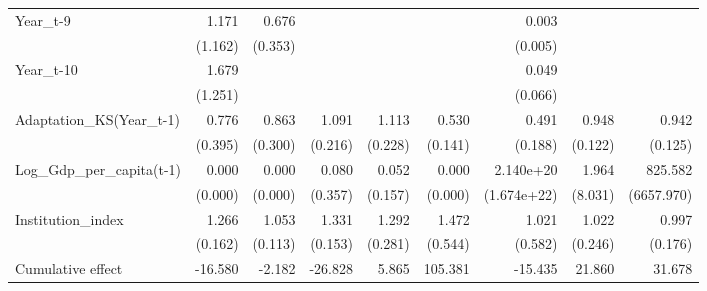 \begin{table}[htbp]
\begin{tabular}{l*{8}{D{.}{.}{-1}}}
Year\_t-9            &       1.171         &       0.676         &                     &                     &                     &       0.003\sym{***}&                     &                     \\
                    &     (1.162)         &     (0.353)         &                     &                     &                     &     (0.005)         &                     &                     \\
Year\_t-10           &       1.679         &                     &                     &                     &                     &       0.049\sym{**} &                     &                     \\
                    &     (1.251)         &                     &                     &                     &                     &     (0.066)         &                     &                     \\
Adaptation\_KS(Year\_t-1)&       0.776         &       0.863         &       1.091         &       1.113         &       0.530\sym{**} &       0.491\sym{*}  &       0.948         &       0.942         \\
                    &     (0.395)         &     (0.300)         &     (0.216)         &     (0.228)         &     (0.141)         &     (0.188)         &     (0.122)         &     (0.125)         \\
Log\_Gdp\_per\_capita(t-1)&       0.000\sym{\%}  &       0.000\sym{***}&       0.080         &       0.052         &       0.000\sym{***}&   2.140e+20         &       1.964         &     825.582         \\
                    &     (0.000)         &     (0.000)         &     (0.357)         &     (0.157)         &     (0.000)         & (1.674e+22)         &     (8.031)         &  (6657.970)         \\
Institution\_index   &       1.266\sym{*}  &       1.053         &       1.331\sym{**} &       1.292         &       1.472         &       1.021         &       1.022         &       0.997         \\
                    &     (0.162)         &     (0.113)         &     (0.153)         &     (0.281)         &     (0.544)         &     (0.582)         &     (0.246)         &     (0.176)         \\
\midrule
Cumulative effect   &     -16.580         &      -2.182         &     -26.828         &       5.865         &     105.381         &     -15.435         &      21.860         &      31.678         \\

\end{tabular}
\end{table}
